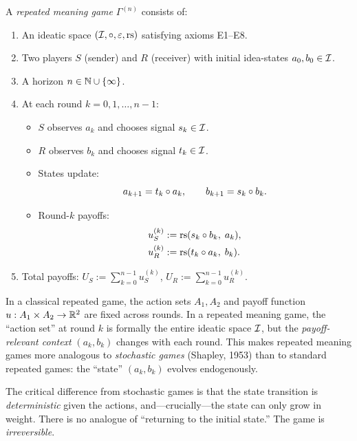 \begin{definition}
\label{def:repeated-mg-full}
A \emph{repeated meaning game} $\Gamma^{(n)}$ consists of:
\begin{enumerate}
  \item An ideatic space $(\mathcal{I}, \circ, \varepsilon, \mathrm{rs})$ satisfying axioms E1--E8.
  \item Two players $S$ (sender) and $R$ (receiver) with initial idea-states
        $a_0, b_0 \in \mathcal{I}$.
  \item A horizon $n \in \mathbb{N} \cup \{\infty\}$.
  \item At each round $k = 0, 1, \ldots, n-1$:
  \begin{itemize}
    \item $S$ observes $a_k$ and chooses signal $s_k \in \mathcal{I}$.
    \item $R$ observes $b_k$ and chooses signal $t_k \in \mathcal{I}$.
    \item States update:
          \[
            a_{k+1} = t_k \circ a_k, \qquad
            b_{k+1} = s_k \circ b_k.
          \]
    \item Round-$k$ payoffs:
          \begin{align*}
            u_S^{(k)} &:= \mathrm{rs}(s_k \circ b_k,\; a_k), \\
            u_R^{(k)} &:= \mathrm{rs}(t_k \circ a_k,\; b_k).
          \end{align*}
  \end{itemize}
  \item Total payoffs:
        $U_S := \sum_{k=0}^{n-1} u_S^{(k)}$, \quad
        $U_R := \sum_{k=0}^{n-1} u_R^{(k)}$.
\end{enumerate}
\end{definition}

\begin{remark}
\label{rem:classical-comparison}
In a classical repeated game, the action sets $A_1, A_2$ and payoff function
$u : A_1 \times A_2 \to \mathbb{R}^2$ are fixed across rounds.  In a repeated meaning
game, the ``action set'' at round $k$ is formally the entire ideatic space
$\mathcal{I}$, but the \emph{payoff-relevant context} $(a_k, b_k)$ changes with each
round.  This makes repeated meaning games more analogous to
\emph{stochastic games} (Shapley, 1953) than to standard repeated games:
the ``state'' $(a_k, b_k)$ evolves endogenously.

The critical difference from stochastic games is that the state transition
is \emph{deterministic} given the actions, and---crucially---the state can
only grow in weight.  There is no analogue of ``returning to the initial
state.''  The game is \emph{irreversible}.
\end{remark}


